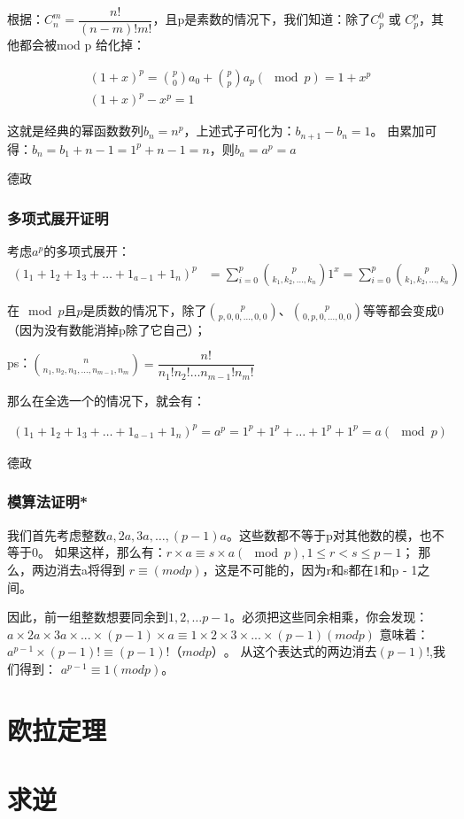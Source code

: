 \documentclass[12pt]{article}
\begin{document}
根据：$C_{n}^m=\dfrac{n!}{(n-m)!m!}$，且p是素数的情况下，我们知道：除了$C_{p}^{0}$ 或 $C_{p}^{p}$，其他都会被mod p 给化掉：

\begin{align*}
    (1+x)^{p} = \binom{p}{0}a_{0} + \binom{p}{p}a_{p}(\mod p) = 1+x^{p} \\ 
    (1+x)^{p} - x^{p} = 1
\end{align*}

这就是经典的幂函数数列$b_{n}=n^{p}$，上述式子可化为：$b_{n+1}-b_{n}=1$。
由累加可得：$b_{n}=b_{1}+n-1=1^{p}+n-1=n$，则$b_{a}=a^{p}=a$

德政

\subsubsection{多项式展开证明}
考虑$a^{p}$的多项式展开：
\begin{align*}
    (1_{1}+1_{2}+1_{3}+\dots+1_{a-1}+1_{n})^{p}&=\sum_{i=0}^p\binom{p}{k_{1},k_{2},\dots,k_{n}}1^{x}=\sum_{i=0}^p\binom{p}{k_{1},k_{2},\dots,k_{n}}
\end{align*}

在$\mod p$且$p$是质数的情况下，除了$\binom{p}{p,0,0,\dots,0,0}$、$\binom{p}{0,p,0,\dots,0,0}$等等都会变成0（因为没有数能消掉p除了它自己）；

ps：$\binom{n}{n_{1},n_{2},n_{3},\dots,n_{m-1},n_{m}}=\dfrac{n!}{n_{1}!n_{2}!\dots n_{m-1}!n_{m}!}$

那么在全选一个的情况下，就会有：

\begin{align*}
    (1_{1}+1_{2}+1_{3}+\dots+1_{a-1}+1_{n})^{p}=a^{p}=1^{p}+1^{p}+\dots+1^{p}+1^{p}=a(\mod p)
\end{align*}

德政

\subsubsection{模算法证明*}

我们首先考虑整数$a,2a,3a,\dots ,(p - 1)a$。这些数都不等于p对其他数的模，也不等于0。
如果这样，那么有：$r × a \equiv s × a (\mod p),1 \leq r < s \leq p - 1$；
那么，两边消去a将得到 $r\equiv (mod p)$，这是不可能的，因为r和s都在1和p - 1之间。

因此，前一组整数想要同余到$1,2,\dots p - 1$。必须把这些同余相乘，你会发现：
$a × 2a × 3a × ... × (p - 1) × a \equiv 1 × 2 × 3 × ... × (p - 1)(mod p)$
意味着：
$a^{p-1} × (p - 1)! \equiv (p - 1)!（mod p）$。
从这个表达式的两边消去$(p - 1)!$,我们得到：
$a^{p-1} \equiv 1 (mod p)$。


\section{欧拉定理}




\section{求逆}
\end{document}
